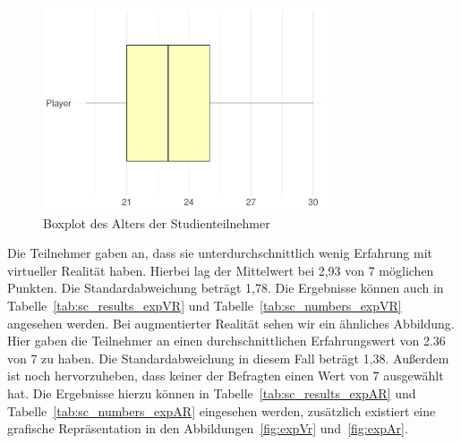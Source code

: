 \begin{figure}
	\centering
	\includegraphics[width=0.75\textwidth]{./appendices/age}
	\caption{Boxplot des Alters der Studienteilnehmer}
	\label{fig:age}
\end{figure}

Die Teilnehmer gaben an, dass sie unterdurchschnittlich wenig Erfahrung mit virtueller Realität haben. Hierbei lag der Mittelwert bei 2,93 von 7 möglichen Punkten. Die Standardabweichung beträgt 1,78. Die Ergebnisse können auch in Tabelle~\ref{tab:sc_results_expVR} und Tabelle~\ref{tab:sc_numbers_expVR} angesehen werden. Bei augmentierter Realität sehen wir ein ähnliches Abbildung. Hier gaben die Teilnehmer an einen durchschnittlichen Erfahrungswert von 2.36 von 7 zu haben. Die Standardabweichung in diesem Fall beträgt 1,38. Außerdem ist noch hervorzuheben, dass keiner der Befragten einen Wert von 7 ausgewählt hat. Die Ergebnisse hierzu können in Tabelle~\ref{tab:sc_results_expAR} und Tabelle~\ref{tab:sc_numbers_expAR} eingesehen werden, zusätzlich existiert eine grafische Repräsentation in den Abbildungen~\ref{fig:expVr} und~\ref{fig:expAr}.


